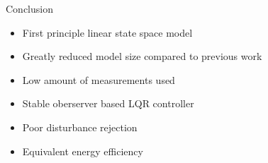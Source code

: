 \begin{frame}{Conclusion}
	 \begin{itemize}
	 	\item First principle linear state space model 
	 	\item Greatly reduced model size compared to previous work
	 	\item Low amount of measurements used
	 	\item Stable oberserver based LQR controller 
	 	\item Poor disturbance rejection
	 	\item Equivalent energy efficiency
	 \end{itemize}
\end{frame}